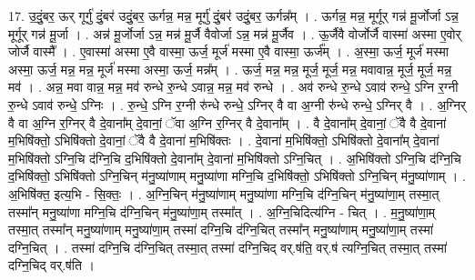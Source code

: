 \documentclass[17pt]{extarticle}
\begin{document}
17. उ॒दुं॒बर॒ ऊर् गूर्गु॑ दुं॒बर॑ उदुं॒बर॒ ऊर्गन्न॒ मन्न॒ मूर्गु॑ दुं॒बर॑ उदुं॒बर॒ ऊर्गन्न᳚म् । . ऊर्गन्न॒ मन्न॒ मूर्गूर् गन्न॑ मू॒र्जोर्जा ऽन्न॒ मूर्गूर् गन्न॑ मू॒र्जा । . अन्न॑ मू॒र्जोर्जा ऽन्न॒ मन्न॑ मू॒र्जै वैवोर्जा ऽन्न॒ मन्न॑ मू॒र्जैव । . ऊ॒र्जैवै वोर्जोर्जै वास्मा॑ अस्मा ए॒वोर् जोर्जै वास्मै᳚ । . ए॒वास्मा॑ अस्मा ए॒वै वास्मा॒ ऊर्ज॒ मूर्ज॑ मस्मा ए॒वै वास्मा॒ ऊर्ज᳚म् । . अ॒स्मा॒ ऊर्ज॒ मूर्ज॑ मस्मा अस्मा॒ ऊर्ज॒ मन्न॒ मन्न॒ मूर्ज॑ मस्मा अस्मा॒ ऊर्ज॒ मन्न᳚म् । . ऊर्ज॒ मन्न॒ मन्न॒ मूर्ज॒ मूर्ज॒ मन्न॒ मवावान्न॒ मूर्ज॒ मूर्ज॒ मन्न॒ मव॑ । . अन्न॒ मवा वान्न॒ मन्न॒ मव॑ रुन्धे रु॒न्धे ऽवान्न॒ मन्न॒ मव॑ रुन्धे । . अव॑ रुन्धे रु॒न्धे ऽवाव॑ रुन्धे॒ ऽग्नि र॒ग्नी रु॒न्धे ऽवाव॑ रुन्धे॒ ऽग्निः । . रु॒न्धे॒ ऽग्नि र॒ग्नी रु॑न्धे रुन्धे॒ ऽग्निर् वै वा अ॒ग्नी रु॑न्धे रुन्धे॒ ऽग्निर् वै । . अ॒ग्निर् वै वा अ॒ग्नि र॒ग्निर् वै दे॒वाना᳚म् दे॒वानां॒ ॅवा अ॒ग्नि र॒ग्निर् वै दे॒वाना᳚म् । . वै दे॒वाना᳚म् दे॒वानां॒ ॅवै वै दे॒वाना॑ म॒भिषि॑क्तो॒ ऽभिषि॑क्तो दे॒वानां॒ ॅवै वै दे॒वाना॑ म॒भिषि॑क्तः । . दे॒वाना॑ म॒भिषि॑क्तो॒ ऽभिषि॑क्तो दे॒वाना᳚म् दे॒वाना॑ म॒भिषि॑क्तो ऽग्नि॒चि द॑ग्नि॒चि द॒भिषि॑क्तो दे॒वाना᳚म् दे॒वाना॑ म॒भिषि॑क्तो ऽग्नि॒चित् । . अ॒भिषि॑क्तो ऽग्नि॒चि द॑ग्नि॒चि द॒भिषि॑क्तो॒ ऽभिषि॑क्तो ऽग्नि॒चिन् म॑नु॒ष्या॑णाम् मनु॒ष्या॑णा मग्नि॒चि द॒भिषि॑क्तो॒ ऽभिषि॑क्तो ऽग्नि॒चिन् म॑नु॒ष्या॑णाम् । . अ॒भिषि॑क्त॒ इत्य॒भि - सि॒क्तः॒ । . अ॒ग्नि॒चिन् म॑नु॒ष्या॑णाम् मनु॒ष्या॑णा मग्नि॒चि द॑ग्नि॒चिन् म॑नु॒ष्या॑णा॒म् तस्मा॒त् तस्मा᳚न् मनु॒ष्या॑णा मग्नि॒चि द॑ग्नि॒चिन् म॑नु॒ष्या॑णा॒म् तस्मा᳚त् । . अ॒ग्नि॒चिदित्य॑ग्नि - चित् । . म॒नु॒ष्या॑णा॒म् तस्मा॒त् तस्मा᳚न् मनु॒ष्या॑णाम् मनु॒ष्या॑णा॒म् तस्मा॑ दग्नि॒चि द॑ग्नि॒चित् तस्मा᳚न् मनु॒ष्या॑णाम् मनु॒ष्या॑णा॒म् तस्मा॑ दग्नि॒चित् । . तस्मा॑ दग्नि॒चि द॑ग्नि॒चित् तस्मा॒त् तस्मा॑ दग्नि॒चिद् वर्.ष॑ति॒ वर्.ष॑ त्यग्नि॒चित् तस्मा॒त् तस्मा॑ दग्नि॒चिद् वर्.ष॑ति । \newline
\end{document}
